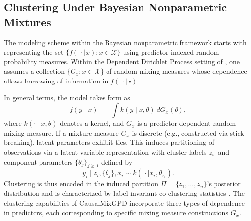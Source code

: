 \documentclass[article]{jss}\usepackage[]{graphicx}\usepackage[]{xcolor}
\DeclareRobustCommand{\pkg}[1]{\textsf{#1}}
\begin{document}
\subsection{Clustering Under Bayesian Nonparametric Mixtures}
\label{subsec:clustering-theory}

The modeling scheme within the Bayesian nonparametric framework starts with representing the set $\{f(\,\cdot\mid x): x\in\mathcal{X}\}$ using predictor-indexed random probability measures. Within the Dependent Dirichlet Process setting of \citet{MacEachern1999,MacEachern2000}, one assumes a collection $\{G_x: x\in\mathcal{X}\}$ of random mixing measures whose dependence allows borrowing of information in $f(\,\cdot\mid x)$.

In general terms, the model takes form as
\begin{equation}
f(y\mid x) \;=\; \int k\!\left(y\mid x,\theta\right)\, dG_x(\theta),
\label{eq:clust_mix_int}
\end{equation}
where $k(\cdot\mid x,\theta)$ denotes a kernel, and $G_x$ is a predictor dependent random mixing measure. If a mixture measure $G_x$ is discrete (e.g., constructed via stick-breaking), latent parameters exhibit ties. This induces partitioning of observations via a latent variable representation with cluster labels $z_i$, and component parameters $\{\theta_j\}_{j\ge1}$ defined by
\begin{equation}
y_i \mid z_i,\{\theta_j\},x_i \sim k\!\left(\,\cdot \mid x_i,\theta_{z_i}\right).
\label{eq:clust_latent}
\end{equation}
Clustering is thus encoded in the induced partition $\Pi=\{z_1,\ldots,z_n\}$'s posterior distribution and is characterized by label-invariant co-clustering statistics \citep{Binder1978,Dahl2006}. The clustering capabilities of \pkg{CausalMixGPD} incorporate three types of dependence in predictors, each corresponding to specific mixing measure constructions $G_x$.
\end{document}
